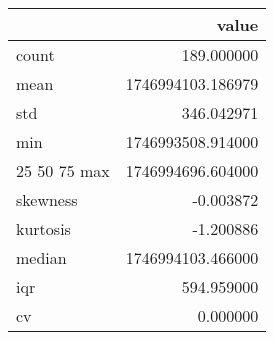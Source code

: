 \begin{tabular}{lr}
\toprule
 & value \\
\midrule
count & 189.000000 \\
mean & 1746994103.186979 \\
std & 346.042971 \\
min & 1746993508.914000 \\
25%
50%
75%
max & 1746994696.604000 \\
skewness & -0.003872 \\
kurtosis & -1.200886 \\
median & 1746994103.466000 \\
iqr & 594.959000 \\
cv & 0.000000 \\
\bottomrule
\end{tabular}
